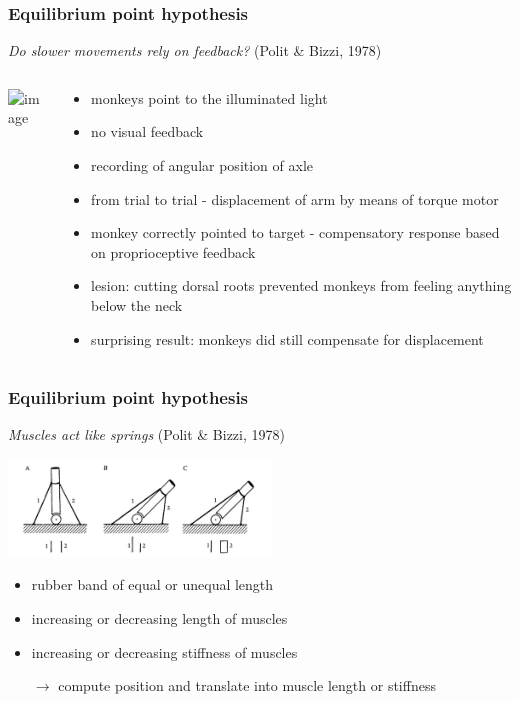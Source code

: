 \documentclass[]{beamer}
\begin{document}
\begin{frame}
 \frametitle{Equilibrium point hypothesis}
\begin{overlayarea}{120mm}{80mm}
\textit{Do slower movements rely on feedback? }(Polit \& Bizzi, 1978)
\begin{columns}[T]
 \begin{column}{40mm}
\begin{center}
 \includegraphics<2->[width=50mm]{figs/l9/equilibrium_point.png}
\end{center}
 \end{column}

\begin{column}{70mm}
\begin{itemize}
 \item<2-> monkeys point to the illuminated light
 \item<2-> no visual feedback 
 \item<2-> recording of angular position of axle
 \item<3-> from trial to trial - displacement of arm by means of torque motor
 \item<3->[$\rightarrow$] monkey correctly pointed to target - compensatory response based on proprioceptive feedback 
 \item<4-> lesion: cutting dorsal roots prevented monkeys from feeling anything below the neck
 \item<4-> surprising result: monkeys did still compensate for displacement
\end{itemize}
 \end{column}
\end{columns}
\end{overlayarea}
\end{frame}



\begin{frame}
 \frametitle{Equilibrium point hypothesis}
\begin{overlayarea}{120mm}{80mm}
\textit{Muscles act like springs} (Polit \& Bizzi, 1978)

\begin{center}
 \includegraphics[width=70mm]{figs/l9/spring.png}
\end{center}

\begin{itemize}
 \item rubber band of equal or unequal length
 \item increasing or decreasing length of muscles
 \item increasing or decreasing stiffness of muscles 
 \item[$\rightarrow$] compute position and translate into muscle length or stiffness
\end{itemize}
\end{overlayarea}
\end{frame}
\end{document}
